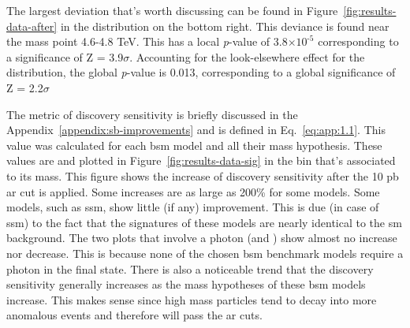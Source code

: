 The largest deviation that's worth discussing can be found in Figure~\ref{fig:results-data-after} in the \mjmu distribution on the bottom right. This deviance is found near 
the mass point 4.6-4.8 TeV. This has a local \textit{p}-value of 3.8$\times\textrm{10}^{\textrm{-5}}$ corresponding to a significance of Z = 3.9$\sigma$. Accounting for the 
look-elsewhere effect for the \mjmu distribution, the global \textit{p}-value is 0.013, corresponding to a global significance of Z = 2.2$\sigma$
\par
The metric of discovery sensitivity \cite{disc-sens} is briefly discussed in the Appendix~\ref{appendix:sb-improvements} and is defined in Eq.~\ref{eq:app:1.1}. This value
was calculated for each \gls{bsm} model and all their mass hypothesis. These values are and plotted in Figure~\ref{fig:results-data-sig} in the bin that's associated to its mass. This figure shows 
the increase of discovery sensitivity after the 10 pb \gls{ar} cut is applied. Some increases are as large as 200\% for some models. Some models, such as \gls{ssm}, show 
little (if any) improvement. This is due (in case of \gls{ssm}) to the fact that the signatures of these models are nearly identical to the \gls{sm} background. The two plots
that involve a photon (\mjph and \mbph) show almost no increase nor decrease. This is because none of the chosen \gls{bsm} benchmark models require a photon in the final state. 
There is also a noticeable trend that the discovery sensitivity generally increases as the mass hypotheses of these \gls{bsm} models increase. This makes sense since high mass 
particles tend to decay into more anomalous events and therefore will pass the \gls{ar} cuts. 

